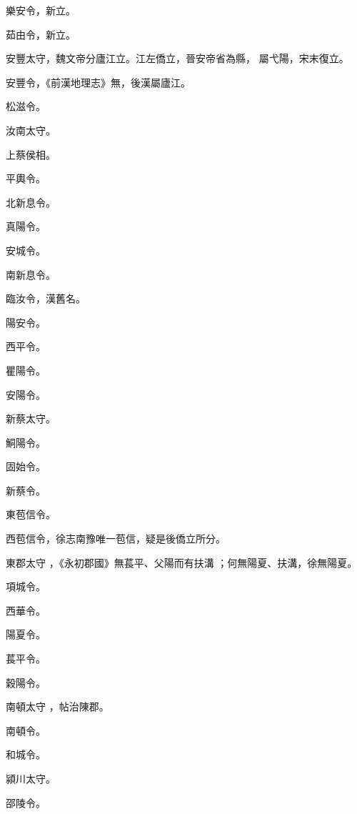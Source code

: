 \begin{pinyinscope}
 樂安令，新立。



 茹由令，新立。



 安豐太守，魏文帝分廬江立。江左僑立，晉安帝省為縣，
 屬弋陽，宋末復立。



 安豐令，《前漢地理志》無，後漢屬廬江。


松滋令。


汝南太守。


上蔡侯相。


平輿令。


北新息令。


真陽令。


安城令。


南新息令。


臨汝令，漢舊名。


陽安令。


西平令。


瞿陽令。


安陽令。


新蔡太守。


鮦陽令。


固始令。


新蔡令。


東苞信令。



 西苞信令，徐志南豫唯一苞信，疑是後僑立所分。


東郡太守
 ，《永初郡國》無萇平、父陽而有扶溝
 ；何無陽夏、扶溝，徐無陽夏。


項城令。


西華令。


陽夏令。


萇平令。


穀陽令。


南頓太守
 ，帖治陳郡。


南頓令。


和城令。


潁川太守。


邵陵令。



\end{pinyinscope}
